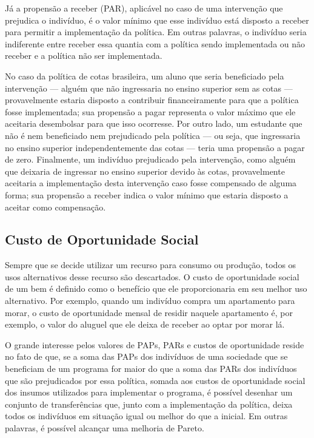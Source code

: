 \documentclass[12pt,letterpaper]{article}
\newcommand{\1}{\mathbbm{1}}
\numberwithin{equation}{section}
\begin{document}
Já a propensão a receber (PAR), aplicável no caso de uma intervenção que prejudica o indivíduo, é o valor mínimo que esse indivíduo está disposto a receber para permitir a implementação da política. Em outras palavras, o indivíduo seria indiferente entre receber essa quantia com a política sendo implementada ou não receber e a política não ser implementada.

No caso da política de cotas brasileira, um aluno que seria beneficiado pela intervenção — alguém que não ingressaria no ensino superior sem as cotas — provavelmente estaria disposto a contribuir financeiramente para que a política fosse implementada; sua propensão a pagar representa o valor máximo que ele aceitaria desembolsar para que isso ocorresse. Por outro lado, um estudante que não é nem beneficiado nem prejudicado pela política — ou seja, que ingressaria no ensino superior independentemente das cotas — teria uma propensão a pagar de zero. Finalmente, um indivíduo prejudicado pela intervenção, como alguém que deixaria de ingressar no ensino superior devido às cotas, provavelmente aceitaria a implementação desta intervenção caso fosse compensado de alguma forma; sua propensão a receber indica o valor mínimo que estaria disposto a aceitar como compensação.

\subsection{Custo de Oportunidade Social}

Sempre que se decide utilizar um recurso para consumo ou produção, todos os usos alternativos desse recurso são descartados. O custo de oportunidade social de um bem é definido como o benefício que ele proporcionaria em seu melhor uso alternativo. Por exemplo, quando um indivíduo compra um apartamento para morar, o custo de oportunidade mensal de residir naquele apartamento é, por exemplo, o valor do aluguel que ele deixa de receber ao optar por morar lá.

O grande interesse pelos valores de PAPs, PARs e custos de oportunidade reside no fato de que, se a soma das PAPs dos indivíduos de uma sociedade que se beneficiam de um programa for maior do que a soma das PARs dos indivíduos que são prejudicados por essa política, somada aos custos de oportunidade social dos insumos utilizados para implementar o programa, é possível desenhar um conjunto de transferências que, junto com a implementação da política, deixa todos os indivíduos em situação igual ou melhor do que a inicial. Em outras palavras, é possível alcançar uma melhoria de Pareto.
\end{document}
